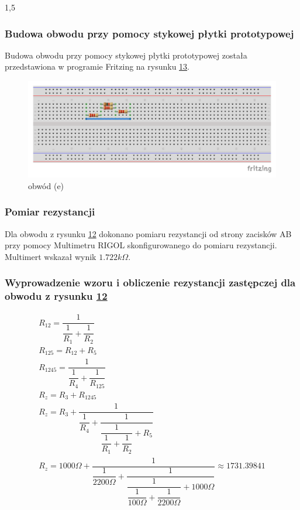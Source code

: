 \documentclass[polish,polish,a4paper]{article}
\begin{document}
\begin{spacing}{1,5}
		
		\subsubsection*{Budowa obwodu przy pomocy stykowej płytki prototypowej}
		Budowa obwodu przy pomocy stykowej płytki prototypowej została przedstawiona w programie Fritzing na rysunku \hyperref[fig:rys13]{13}.
		\begin{figure}[H]
			\centering
			\includegraphics[scale=0.9]{e_bb.pdf}
			\caption{obwód (e)}
			\label{fig:rys13}
		\end{figure}
		\subsubsection*{Pomiar rezystancji}
		Dla obwodu z rysunku \hyperref[eq:rys12]{12} dokonano pomiaru rezystancji od strony zacisków AB przy pomocy Multimetru RIGOL skonfigurowanego do pomiaru rezystancji. Multimert wskazał wynik $1.722k\Omega$.
		
		\subsubsection*{Wyprowadzenie wzoru i obliczenie rezystancji zastępczej  dla obwodu z rysunku \hyperref[eq:rys12]{12}}	
		\begin{gather*}
		R_{12} = \dfrac{1}{\dfrac{1}{R_{1}} + \dfrac{1}{R_{2}}}\\
		R_{125} = R_{12} + R_{5}\\
		R_{1245} = \dfrac{1}{\dfrac{1}{R_{4}} + \dfrac{1}{R_{125}}}\\
		R_{z} = R_{3} + R_{1245}\\
		R_{z} = R_{3}+ \dfrac{1}{\dfrac{1}{R_{4}} + \dfrac{1}{\dfrac{1}{\dfrac{1}{R_{1}} + \dfrac{1}{R_{2}}}+ R_{5}}}\\
		R_{z} = 1000\Omega+ \dfrac{1}{\dfrac{1}{2200\Omega} + \dfrac{1}{\dfrac{1}{\dfrac{1}{100\Omega} + \dfrac{1}{2200\Omega}}+ 1000\Omega}} \approx 1731.39841
		\end{gather*}
		

\end{spacing}
\end{document}
